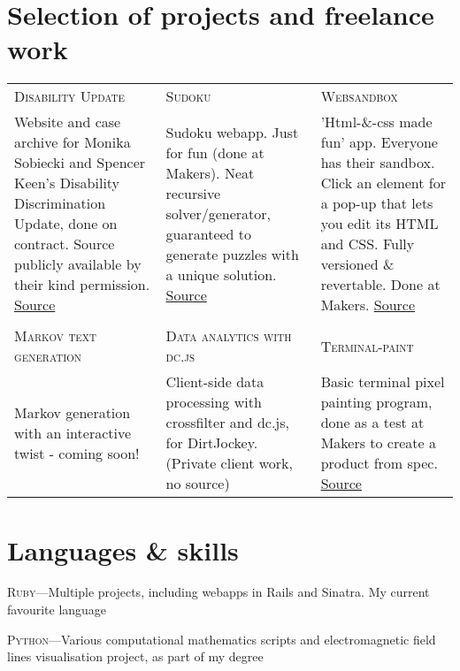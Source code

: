 \documentclass[a4paper,10pt]{article}
\begin{document}
\section{Selection of projects and freelance work}
\begin{tabularx}{\linewidth}{XXX} 
  \textsc{Disability Update} & \textsc{Sudoku} & \textsc{Websandbox} \\

  Website and case archive for Monika Sobiecki and Spencer Keen's Disability
  Discrimination Update, done on contract. Source publicly available by their
  kind permission. \href{https://github.com/SimonWoolf/disability-discrimination-update}{Source} &

  Sudoku webapp. Just for fun (done at Makers). Neat recursive solver/generator, guaranteed 
  to generate puzzles with a unique solution. \href{https://github.com/SimonWoolf/sudoku}{Source} &

  'Html-\&-css made fun' app. Everyone has their sandbox. Click an element for
  a pop-up that lets you edit its HTML and CSS. Fully versioned \& revertable. 
  Done at Makers. \href{https://github.com/SimonWoolf/websandbox}{Source} \\

  & & \\

  \textsc{Markov text generation} & \textsc{Data analytics with dc.js} &
  \textsc{Terminal-paint} \\

  Markov generation with an interactive twist - coming soon! &

  Client-side data processing with crossfilter and dc.js, for DirtJockey. 
  (Private client work, no source) &

  Basic terminal pixel painting program, done as a test at Makers to create a
  product from spec. \href{https://github.com/SimonWoolf/test6}{Source} \\
\end{tabularx}

\section{Languages \& skills}

\textsc{Ruby}---Multiple projects, including webapps in Rails and Sinatra. My current favourite language

\textsc{Python}---Various computational mathematics scripts and electromagnetic field lines visualisation project, as part of my degree
\end{document}
